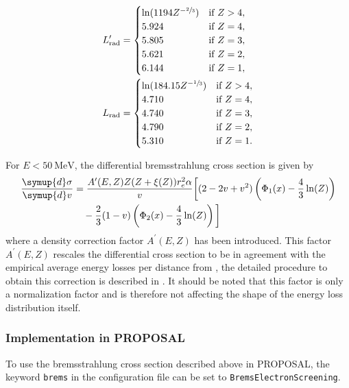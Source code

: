 \begin{align}
	L_\text{rad}^{\prime} &=
	\begin{cases}
		\ln(1194 Z^{-\sfrac{2}{3}}) & \text{if $Z > 4$}, \\
		5.924 & \text{if $Z = 4$}, \\
		5.805 & \text{if $Z = 3$}, \\
		5.621 & \text{if $Z = 2$}, \\
		6.144 & \text{if $Z = 1$},
	\end{cases} \\
	L_\text{rad} &=
	\begin{cases}
		\ln(184.15 Z^{-\sfrac{1}{3}}) & \text{if $Z > 4$}, \\
		4.710 & \text{if $Z = 4$}, \\
		4.740 & \text{if $Z = 3$}, \\
		4.790 & \text{if $Z = 2$}, \\
		5.310 & \text{if $Z = 1$}.
	\end{cases}
\end{align}

For $E < \SI{50}{\mega\electronvolt}$, the differential bremsstrahlung cross section is given by
%
\begin{equation}
	\label{eqn:brems_low}
	\begin{split}
	\frac{\symup{d}\sigma}{\symup{d}v} &= \frac{A^{\prime}(E, Z) Z (Z + \xi(Z)) r_e^2 \alpha}{v} \biggl[ (2 - 2 v + v^2) \left( \Phi_1(x) - \frac{4}{3} \ln(Z) \right) \\ &\quad- \frac{2}{3} (1 - v) \left( \Phi_2(x) - \frac{4}{3} \ln(Z) \right) \biggl]
	\end{split}	
\end{equation}
%
where a density correction factor $A^{\prime}(E,Z)$ has been introduced.
This factor $A^{\prime}(E,Z)$ rescales the differential cross section to be in agreement with the empirical average energy losses per distance from \cite{icru37}, the detailed procedure to obtain this correction is described in \cite{pirs}.
It should be noted that this factor is only a normalization factor and is therefore not affecting the shape of the energy loss distribution itself.

\subsubsection{Implementation in PROPOSAL}

\begin{sloppypar}
To use the bremsstrahlung cross section described above in PROPOSAL, the keyword \texttt{brems} in the configuration file can be set to \texttt{BremsElectronScreening}.
\end{sloppypar}

